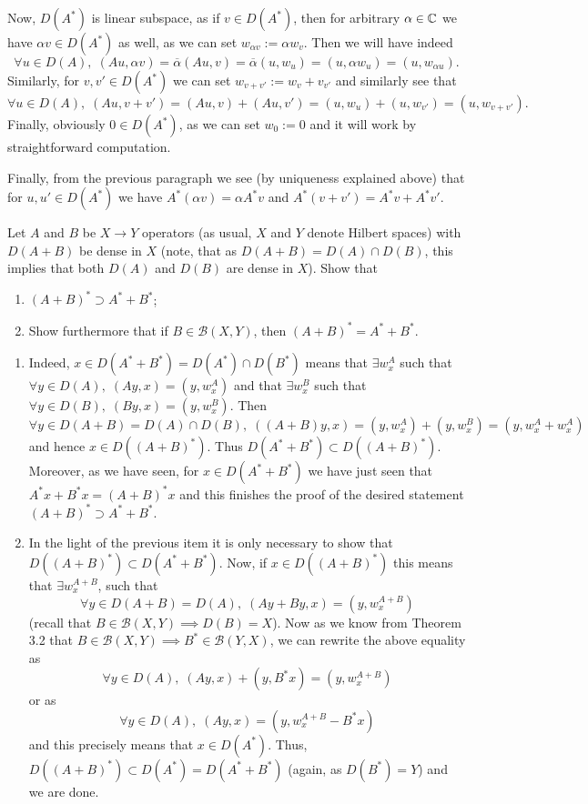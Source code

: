 \documentclass[10pt]{article} %
\begin{document}
Now, $D(A^*)$ is linear subspace, as if $v\in D(A^*)$, then for arbitrary $\alpha\in\mathbb{C}$ we have $\alpha v\in D(A^*)$ as well,
as we can set $w_{\alpha v}:=\alpha w_v$. Then we will have indeed
\[\forall u\in D(A),\;(Au,\alpha v)=\overline{\alpha}(Au,v)=\overline{\alpha}(u,w_u)=(u,\alpha w_u)=(u,w_{\alpha u}).\]
Similarly, for $v,v'\in D(A^*)$ we can set $w_{v+v'}:=w_v+v_{v'}$ and similarly see that
\[\forall u\in D(A),\;(Au,v+v')=(Au,v)+(Au,v')=(u,w_u)+(u,w_{v'})=(u,w_{v+v'}).\]
Finally, obviously $0\in D(A^*)$, as we can set $w_0:=0$ and it will work by straightforward computation.

Finally, from the previous paragraph we see (by uniqueness explained above) that for $u,u'\in D(A^*)$ we have
$A^*(\alpha v)=\alpha A^*v$ and $A^*(v+v')=A^*v+A^*v'$.
\begin{myprob}[Proposition 3.2] Let $A$ and $B$ be $X\to Y$ operators (as usual, $X$ and $Y$ denote Hilbert spaces) with
$D(A+B)$ be dense in $X$ (note, that as $D(A+B)=D(A)\cap D(B)$, this implies that both $D(A)$ and $D(B)$ are dense in $X$). Show that
\begin{enumerate}[1)]
\item $(A+B)^*\supset A^*+B^*$;
\item Show furthermore that if $B\in \mathcal{B}(X,Y)$, then $(A+B)^*=A^*+B^*$.
\end{enumerate}
\end{myprob}
\begin{enumerate}[1)]
\item Indeed, $x\in D(A^*+B^*)=D(A^*)\cap D(B^*)$ means that $\exists w^A_x$ such that $\forall y\in D(A),\;(Ay,x)=(y,w^A_x)$
and that $\exists w^B_x$ such that $\forall y\in D(B),\;(By,x)=(y,w^B_x)$.
Then $\forall y\in D(A+B)=D(A)\cap D(B),\;((A+B)y,x)=(y,w^A_x)+(y,w^B_x)=(y,w^A_x+w^A_x)$ and hence $x\in D((A+B)^*)$.
Thus $D(A^*+B^*)\subset D((A+B)^*)$. Moreover, as we have seen, for $x\in D(A^*+B^*)$ we have just seen that
$A^*x+B^*x=(A+B)^*x$
and this finishes the proof of the desired statement $(A+B)^*\supset A^*+B^*$.
\item In the light of the previous item it is only necessary to show that $D((A+B)^*)\subset D(A^*+B^*)$.
Now, if $x\in D((A+B)^*)$ this means that $\exists w^{A+B}_x$, such that
\[\forall y\in D(A+B)=D(A),\;(Ay+By,x)=(y,w^{A+B}_x)\]
(recall that $B\in\mathcal{B}(X,Y)\implies D(B)=X$).
Now as we know from Theorem 3.2 that $B\in\mathcal{B}(X,Y)\implies B^*\in\mathcal{B}(Y,X)$, 
we can rewrite the above equality as
\[\forall y\in D(A),\;(Ay,x)+(y,B^*x)=(y,w^{A+B}_x)\]
or as
\[\forall y\in D(A),\;(Ay,x)=(y,w^{A+B}_x-B^*x)\]
and this precisely means that $x\in D(A^*)$. Thus, $D((A+B)^*)\subset D(A^*)=D(A^*+B^*)$ (again, as $D(B^*)=Y$) and we are done.
\end{enumerate}
\end{document}
